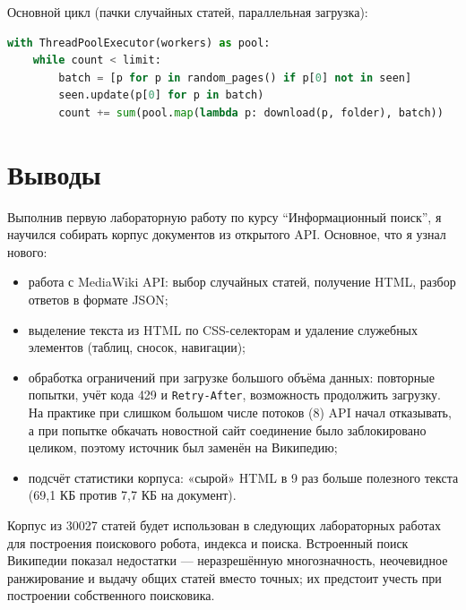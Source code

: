 Основной цикл (пачки случайных статей, параллельная загрузка):

\begin{lstlisting}[language=Python]
with ThreadPoolExecutor(workers) as pool:
    while count < limit:
        batch = [p for p in random_pages() if p[0] not in seen]
        seen.update(p[0] for p in batch)
        count += sum(pool.map(lambda p: download(p, folder), batch))
\end{lstlisting}

\pagebreak
\section{Выводы}
Выполнив первую лабораторную работу по курсу \enquote{Информационный поиск}, я
научился собирать корпус документов из открытого API. Основное, что я узнал
нового:

\begin{itemize}
    \item работа с MediaWiki API: выбор случайных статей, получение HTML,
    разбор ответов в формате JSON;
    \item выделение текста из HTML по CSS-селекторам и удаление служебных
    элементов (таблиц, сносок, навигации);
    \item обработка ограничений при загрузке большого объёма данных:
    повторные попытки, учёт кода 429 и \texttt{Retry-After}, возможность
    продолжить загрузку. На практике при слишком большом числе потоков (8) API
    начал отказывать, а при попытке обкачать новостной сайт соединение было
    заблокировано целиком, поэтому источник был заменён на Википедию;
    \item подсчёт статистики корпуса: «сырой» HTML в 9 раз больше полезного
    текста (69{,}1 КБ против 7{,}7 КБ на документ).
\end{itemize}

Корпус из 30027 статей будет использован в следующих лабораторных работах для
построения поискового робота, индекса и поиска. Встроенный поиск Википедии
показал недостатки --- неразрешённую многозначность, неочевидное ранжирование и
выдачу общих статей вместо точных; их предстоит учесть при построении
собственного поисковика.
